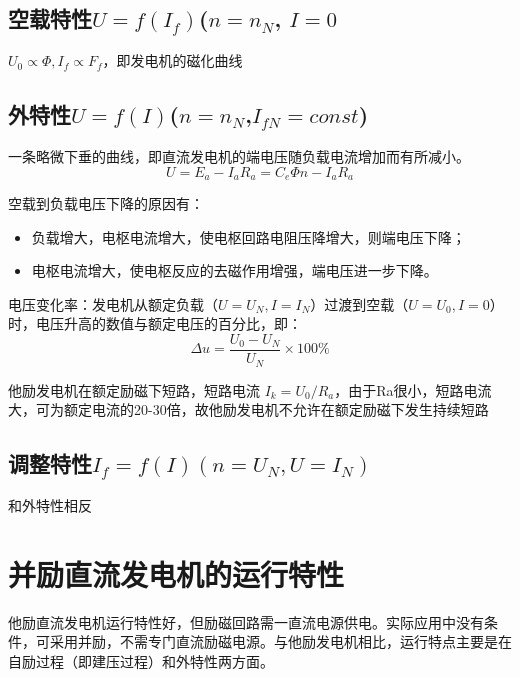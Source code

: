 \documentclass[blue]{elegantnote}
\begin{document}
\subsection{空载特性$U=f(I_f)$($n=n_{N}$, $I=0$}
$U_{0}\propto \Phi,I_{f}\propto F_{f}$，即发电机的磁化曲线
\subsection{外特性$U=f(I)$($n=n_{N}$,$I_{fN}=const$)}
一条略微下垂的曲线，即直流发电机的端电压随负载电流增加而有所减小。 
\[U = {E_a} - {I_a}{R_a} = {C_e}\Phi n - {I_a}{R_a}\]
\begin{note}
	空载到负载电压下降的原因有：
\begin{itemize}
	\item 负载增大，电枢电流增大，使{\color{blue}电枢回路电阻压降增大}，则端电压下降；
	\item 电枢电流增大，使电枢反应的{\color{blue}去磁作用增强}，端电压进一步下降。
\end{itemize}
\end{note}
电压变化率：发电机从额定负载（$U=U_{N},I=I_{N}$）过渡到空载（$U=U_{0},I=0$）时，电压升高的数值与额定电压的百分比，即：
$$\Delta u = \frac{{{U_0} - {U_N}}}{{{U_N}}} \times 100\% $$
\begin{note}
他励发电机在额定励磁下短路，短路电流 $I_k=U_0/R_a$，由于Ra很小，短路电流大，可为额定电流的20-30倍，故他励发电机不允许在额定励磁下发生持续短路	
\end{note}
\subsection{调整特性$I_{f}=f(I)(n=U_N, U=I_N)$ }	
和外特性相反
\section{并励直流发电机的运行特性}
他励直流发电机运行特性好，但励磁回路需一直流电源供电。实际应用中没有条件，可采用{\color{red}并励，不需专门直流励磁电源}。与他励发电机相比，运行特点主要是在自励过程（即建压过程）和外特性两方面。
\end{document}
